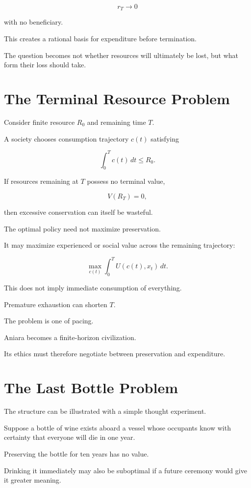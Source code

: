 \documentclass[11pt,oneside]{book}
\theoremstyle{definition}
\theoremstyle{remark}
\begin{document}
\[
r_T\rightarrow0
\]

with no beneficiary.

This creates a rational basis for expenditure before termination.

The question becomes not whether resources will ultimately be lost, but what form their loss should take.

\section{The Terminal Resource Problem}

Consider finite resource \(R_0\) and remaining time \(T\).

A society chooses consumption trajectory \(c(t)\) satisfying

\[
\int_0^T c(t)\,dt
\leq
R_0.
\]

If resources remaining at \(T\) possess no terminal value,

\[
V(R_T)=0,
\]

then excessive conservation can itself be wasteful.

The optimal policy need not maximize preservation.

It may maximize experienced or social value across the remaining trajectory:

\[
\max_{c(t)}
\int_0^T
U(c(t),x_t)\,dt.
\]

This does not imply immediate consumption of everything.

Premature exhaustion can shorten \(T\).

The problem is one of pacing.

Aniara becomes a finite-horizon civilization.

Its ethics must therefore negotiate between preservation and expenditure.

\section{The Last Bottle Problem}

The structure can be illustrated with a simple thought experiment.

Suppose a bottle of wine exists aboard a vessel whose occupants know with certainty that everyone will die in one year.

Preserving the bottle for ten years has no value.

Drinking it immediately may also be suboptimal if a future ceremony would give it greater meaning.
\end{document}
